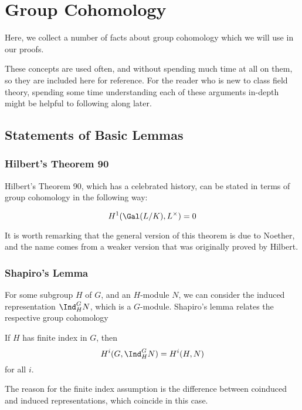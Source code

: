 
\section{Group Cohomology}

Here, we collect a number of facts about group cohomology
which we will use in our proofs. 

These concepts are used often, and without spending much
time at all on them, so they are included here for 
reference.
For the reader who is new to class field theory, 
spending some time understanding each of these
arguments in-depth might be helpful to following along later.

\subsection{Statements of Basic Lemmas}

\subsubsection{Hilbert's Theorem 90}

Hilbert's Theorem 90, which has a celebrated history,
can be stated in terms of group cohomology in the following
way:

\begin{theorem}
	\[
		H^{1}(\Gal(L / K), L^{\times}) = 0
	\] 
\end{theorem}

It is worth remarking that the general version of this
theorem is due to Noether, and the name comes from
a weaker version that was originally proved by Hilbert.

\subsubsection{Shapiro's Lemma}

For some subgroup \(H\) of \(G\), and an \(H\)-module \(N\),
we can consider the induced representation
\(\Ind_{H}^{G} N\), which is a \(G\)-module.
Shapiro's lemma relates the respective group cohomology 

\begin{lemma}
	If \(H\) has finite index in \(G\), then 
	\[
		H^{i}(G,\Ind_{H}^{G} N) = H^{i}(H,N)
	\] 
	for all \(i\). 
\end{lemma}

\begin{remark}
	The reason for the finite index assumption is the 
	difference between coinduced and induced representations,
	which coincide in this case.
\end{remark}

